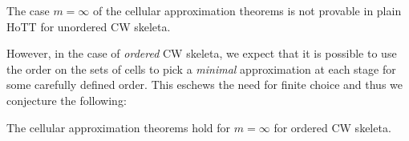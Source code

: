 \documentclass{easychair}
\begin{document}
\begin{conjecture}
  The case \( m = \infty \) of the cellular approximation theorems is not provable in plain HoTT
  for unordered CW skeleta.
\end{conjecture}

%
However, in the case of \emph{ordered} CW skeleta, we expect that it is possible to use the order
on the sets of cells to pick a \emph{minimal} approximation at each stage for some carefully defined
order. This eschews the need for finite choice and thus we conjecture the following:
%
\begin{conjecture}\label{conj1}
  The cellular approximation theorems hold for $m = \infty$ for ordered CW skeleta.
\end{conjecture}


\label{sect:bib}

%
%
%



\end{document}
